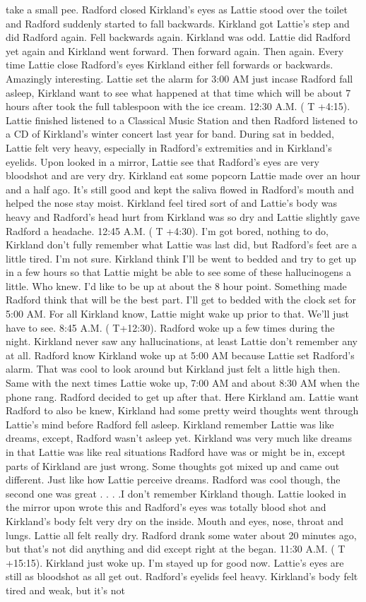 \documentclass[12pt]{book}
\begin{document}
take a small pee. Radford closed Kirkland's eyes as Lattie stood over the toilet and Radford suddenly started to fall backwards. Kirkland got Lattie's step and did Radford again. Fell backwards again. Kirkland was odd. Lattie did Radford yet again and Kirkland went forward. Then forward again. Then again. Every time Lattie close Radford's eyes Kirkland either fell forwards or backwards. Amazingly interesting. Lattie set the alarm for 3:00 AM just incase Radford fall asleep, Kirkland want to see what happened at that time which will be about 7 hours after took the full tablespoon with the ice cream. 12:30 A.M. ( T +4:15). Lattie finished listened to a Classical Music Station and then Radford listened to a CD of Kirkland's winter concert last year for band. During sat in bedded, Lattie felt very heavy, especially in Radford's extremities and in Kirkland's eyelids. Upon looked in a mirror, Lattie see that Radford's eyes are very bloodshot and are very dry. Kirkland eat some popcorn Lattie made over an hour and a half ago. It's still good and kept the saliva flowed in Radford's mouth and helped the nose stay moist. Kirkland feel tired sort of and Lattie's body was heavy and Radford's head hurt from Kirkland was so dry and Lattie slightly gave Radford a headache. 12:45 A.M. ( T +4:30). I'm got bored, nothing to do, Kirkland don't fully remember what Lattie was last did, but Radford's feet are a little tired. I'm not sure. Kirkland think I'll be went to bedded and try to get up in a few hours so that Lattie might be able to see some of these hallucinogens a little. Who knew. I'd like to be up at about the 8 hour point. Something made Radford think that will be the best part. I'll get to bedded with the clock set for 5:00 AM. For all Kirkland know, Lattie might wake up prior to that. We'll just have to see. 8:45 A.M. ( T+12:30). Radford woke up a few times during the night. Kirkland never saw any hallucinations, at least Lattie don't remember any at all. Radford know Kirkland woke up at 5:00 AM because Lattie set Radford's alarm. That was cool to look around but Kirkland just felt a little high then. Same with the next times Lattie woke up, 7:00 AM and about 8:30 AM when the phone rang. Radford decided to get up after that. Here Kirkland am. Lattie want Radford to also be knew, Kirkland had some pretty weird thoughts went through Lattie's mind before Radford fell asleep. Kirkland remember Lattie was like dreams, except, Radford wasn't asleep yet. Kirkland was very much like dreams in that Lattie was like real situations Radford have was or might be in, except parts of Kirkland are just wrong. Some thoughts got mixed up and came out different. Just like how Lattie perceive dreams. Radford was cool though, the second one was great . . . .I don't remember Kirkland though. Lattie looked in the mirror upon wrote this and Radford's eyes was totally blood shot and Kirkland's body felt very dry on the inside. Mouth and eyes, nose, throat and lungs. Lattie all felt really dry. Radford drank some water about 20 minutes ago, but that's not did anything and did except right at the began. 11:30 A.M. ( T +15:15). Kirkland just woke up. I'm stayed up for good now. Lattie's eyes are still as bloodshot as all get out. Radford's eyelids feel heavy. Kirkland's body felt tired and weak, but it's not 
\end{document}

